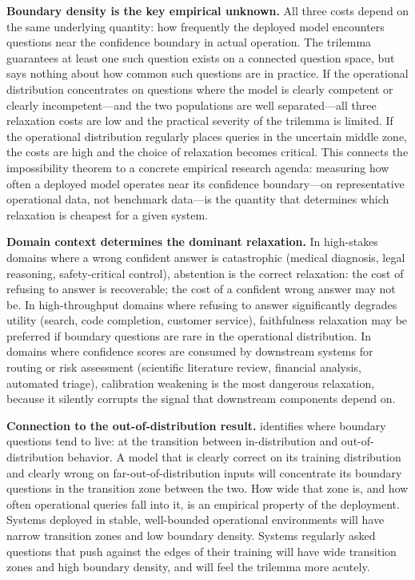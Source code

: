 \documentclass[10pt]{article}
\begin{document}
\textbf{Boundary density is the key empirical unknown.}
All three costs depend on the same underlying quantity: how frequently the
deployed model encounters questions near the confidence boundary in actual
operation. The trilemma guarantees at least one such question exists on a
connected question space, but says nothing about how common such questions
are in practice. If the operational distribution concentrates on questions
where the model is clearly competent or clearly incompetent---and the two
populations are well separated---all three relaxation costs are low and the
practical severity of the trilemma is limited. If the operational
distribution regularly places queries in the uncertain middle zone, the costs
are high and the choice of relaxation becomes critical. This connects the
impossibility theorem to a concrete empirical research agenda: measuring how
often a deployed model operates near its confidence boundary---on
representative operational data, not benchmark data---is the quantity that
determines which relaxation is cheapest for a given system.

\textbf{Domain context determines the dominant relaxation.}
In high-stakes domains where a wrong confident answer is catastrophic
(medical diagnosis, legal reasoning, safety-critical control), abstention is
the correct relaxation: the cost of refusing to answer is recoverable; the
cost of a confident wrong answer may not be. In high-throughput domains
where refusing to answer significantly degrades utility (search, code
completion, customer service), faithfulness relaxation may be preferred if
boundary questions are rare in the operational distribution. In domains
where confidence scores are consumed by downstream systems for routing or
risk assessment (scientific literature review, financial analysis, automated
triage), calibration weakening is the most dangerous relaxation, because it
silently corrupts the signal that downstream components depend on.

\textbf{Connection to the out-of-distribution result.}
 identifies where boundary questions tend to live: at the
transition between in-distribution and out-of-distribution behavior. A model
that is clearly correct on its training distribution and clearly wrong on
far-out-of-distribution inputs will concentrate its boundary questions in
the transition zone between the two. How wide that zone is, and how often
operational queries fall into it, is an empirical property of the
deployment. Systems deployed in stable, well-bounded operational environments
will have narrow transition zones and low boundary density. Systems regularly
asked questions that push against the edges of their training will have wide
transition zones and high boundary density, and will feel the trilemma more
acutely.
\end{document}
